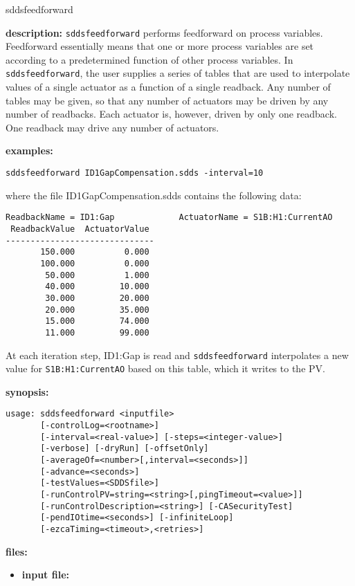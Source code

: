 \begin{sddsprog}{sddsfeedforward}
\item \textbf{description:}
\verb+sddsfeedforward+ performs feedforward on process variables.
Feedforward essentially means that one or more process variables are
set according to a predetermined function of other process variables.
In \verb+sddsfeedforward+, the user supplies a series of tables that
are used to interpolate values of a single actuator as a function of a
single readback.  Any number of tables may be given, so that any
number of actuators may be driven by any number of readbacks.  Each
actuator is, however, driven by only one readback.  One readback may
drive any number of actuators.

\item \textbf{examples:}
\begin{verbatim}
sddsfeedforward ID1GapCompensation.sdds -interval=10
\end{verbatim}
where the file ID1GapCompensation.sdds contains the following
data:
\begin{verbatim}
ReadbackName = ID1:Gap             ActuatorName = S1B:H1:CurrentAO
 ReadbackValue  ActuatorValue
------------------------------
       150.000          0.000
       100.000          0.000
        50.000          1.000
        40.000         10.000
        30.000         20.000
        20.000         35.000
        15.000         74.000
        11.000         99.000
\end{verbatim}
At each iteration step, ID1:Gap is read and \verb+sddsfeedforward+ interpolates a new value for
\verb+S1B:H1:CurrentAO+ based on this table, which it writes to the PV.
\item \textbf{synopsis:}
\begin{verbatim}
usage: sddsfeedforward <inputfile>
       [-controlLog=<rootname>]
       [-interval=<real-value>] [-steps=<integer-value>]
       [-verbose] [-dryRun] [-offsetOnly]
       [-averageOf=<number>[,interval=<seconds>]]
       [-advance=<seconds>]
       [-testValues=<SDDSfile>]
       [-runControlPV=string=<string>[,pingTimeout=<value>]]
       [-runControlDescription=<string>] [-CASecurityTest]
       [-pendIOtime=<seconds>] [-infiniteLoop]
       [-ezcaTiming=<timeout>,<retries>]
\end{verbatim}
\item \textbf{files:}
\begin{itemize}
  \item \textbf{input file:} \par

\end{itemize}
\end{sddsprog}
